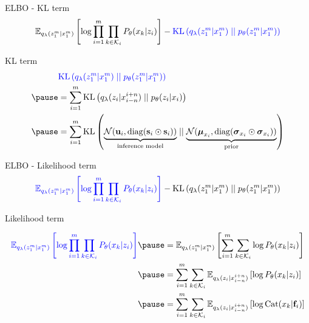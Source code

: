 \begin{frame}{ELBO - KL term}
\begin{equation*}
\begin{aligned}
\mathbb E_{q_\lambda(z_1^m|x_1^m)} \left[ \log \prod_{i=1}^m \prod_{k \in \mathcal K_i} P_\theta(x_k|z_i) \right] - \textcolor{blue}{\operatorname{KL}\left(q_\lambda(z_1^m|x_1^m)\mid\mid p_\theta(z_1^m|x_1^m)\right)}
\end{aligned}
\end{equation*}

KL term
\begin{equation*}
\begin{aligned}
&\textcolor{blue}{\KL{q_\lambda(z_1^m|x_1^m)}{p_\theta(z_1^m|x_1^m)}} \\ \pause
 &=  \sum_{i=1}^m \KL{q_\lambda(z_i|x_{i-n}^{i+n})}{p_\theta(z_i|x_i)} \\ \pause
 &=  \sum_{i=1}^m \KL{\underbrace{\mathcal N(\mathbf u_i, \diag(\mathbf s_i \odot \mathbf s_i))}_{\text{inference model}}}{\underbrace{\mathcal N(\boldsymbol \mu_{x_i}, \diag(\boldsymbol \sigma_{x_i} \odot \boldsymbol \sigma_{x_i}))}_{\text{prior}}} 
\end{aligned}
\end{equation*}


\end{frame}


\begin{frame}{ELBO - Likelihood term}
\begin{equation*}
\begin{aligned}
\textcolor{blue}{\mathbb E_{q_\lambda(z_1^m|x_1^m)} \left[ \log \prod_{i=1}^m \prod_{k \in \mathcal K_i} P_\theta(x_k|z_i) \right]} - \operatorname{KL}\left(q_\lambda(z_1^m|x_1^m)\mid\mid p_\theta(z_1^m|x_1^m)\right)
\end{aligned}
\end{equation*}
\pause

Likelihood term
\begin{small}
\begin{equation*}
\begin{aligned}
\textcolor{blue}{\mathbb E_{q_\lambda(z_1^m|x_1^m)} \left[ \log \prod_{i=1}^m \prod_{k \in \mathcal K_i} P_\theta(x_k|z_i) \right]}  \pause
 &= \mathbb E_{q_\lambda(z_1^m|x_1^m)} \left[  \sum_{i=1}^m \sum_{k \in \mathcal K_i} \log P_\theta(x_k|z_i) \right] \\ \pause
&= \sum_{i=1}^m \sum_{k \in \mathcal K_i} \mathbb E_{q_\lambda(z_i|x_{i-n}^{i+n})} \left[  \log P_\theta(x_k|z_i) \right] \\ \pause
&= \sum_{i=1}^m \sum_{k \in \mathcal K_i} \mathbb E_{q_\lambda(z_i|x_{i-n}^{i+n})} \left[  \log \Cat(x_k|\mathbf f_i) \right]
\end{aligned}
\end{equation*}
\end{small}

\end{frame}

